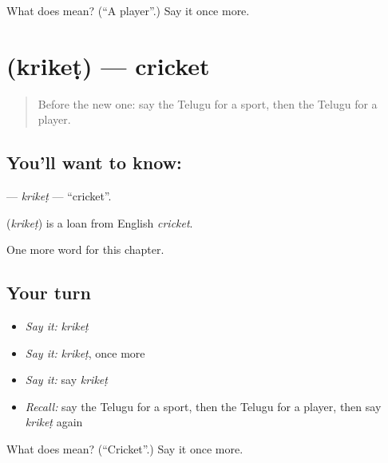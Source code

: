 \begin{tcolorbox}[breakable,colback=teal!4,colframe=teal!35!black,title={Before you move on}]
What does  mean? (\textquotedblleft{}A player\textquotedblright{}.) Say it once more.
\end{tcolorbox}
\section[\texorpdfstring{\te{క్రికెట్} (krikeṭ)}{క్రికెట్ (krikeṭ)}]{ (krikeṭ) — cricket}

\label{lesson:TE-C304-kriket}



\begin{quote}
Before the new one: say the Telugu for a sport, then the Telugu for a player.
\end{quote}

\subsection*{You'll want to know: }
\textbf{} — \emph{krikeṭ} — \textquotedblleft{}cricket\textquotedblright{}.

\begin{cousinweb}
\textbf{} (\emph{krikeṭ}) is a loan from English \emph{cricket}.
\end{cousinweb}

\begin{grammarlens}[title={What you've built}]
One more word for this chapter.
\end{grammarlens}

\subsection*{Your turn}
\begin{itemize}
\raggedright
  \item \emph{Say it:} \emph{krikeṭ}
  \item \emph{Say it:} \emph{krikeṭ}, once more
  \item \emph{Say it:} say \emph{krikeṭ}
  \item \emph{Recall:} say the Telugu for a sport, then the Telugu for a player, then say \emph{krikeṭ} again
\end{itemize}

\begin{tcolorbox}[breakable,colback=teal!4,colframe=teal!35!black,title={Before you move on}]
What does  mean? (\textquotedblleft{}Cricket\textquotedblright{}.) Say it once more.
\end{tcolorbox}

